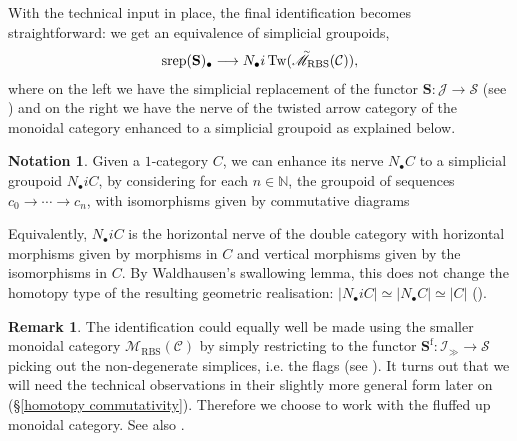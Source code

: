 \documentclass[12pt, reqno]{amsart}
\theoremstyle{plain}
\theoremstyle{definition}
\newtheorem{remark}[theorem]{Remark}
\newtheorem{notation}[theorem]{Notation}
\newcommand{\N}{\mathbb N}
\begin{document}
With the technical input in place, the final identification becomes straightforward: we get an equivalence of simplicial groupoids,
\begin{align*}
\operatorname{srep}(\mathbf{S})_\bullet \longrightarrow N_\bullet i \operatorname{Tw}(\accentset{\sim}{\mathscr{M}}_{\operatorname{RBS}}(\mathcal{C})),
\end{align*}
where on the left we have the simplicial replacement of the functor $\mathbf{S}\colon \mathcal{J}\rightarrow \mathcal{S}$ (see ) and on the right we have the nerve of the twisted arrow category of the monoidal category enhanced to a simplicial groupoid as explained below.

\begin{notation}\label{maximal subgroupoids}
Given a $1$-category $C$, we can enhance its nerve $N_\bullet C$ to a simplicial groupoid $N_\bullet iC$, by considering for each $n\in \N$, the groupoid of sequences $c_0\rightarrow \cdots \rightarrow c_n$, with isomorphisms given by commutative diagrams
\begin{center}
\end{center}
Equivalently, $N_\bullet iC$ is the horizontal nerve of the double category with horizontal morphisms given by morphisms in $C$ and vertical morphisms given by the isomorphisms in $C$. By Waldhausen's swallowing lemma, this does not change the homotopy type of the resulting geometric realisation: $|N_\bullet iC|\simeq |N_\bullet C| \simeq |C|$ (\cite[Lemma 1.6.5]{Waldhausen}).
\end{notation}

\begin{remark}
The identification could equally well be made using the smaller monoidal category $\mathscr{M}_{\operatorname{RBS}}(\mathcal{C})$ by simply restricting to the functor $\mathbf{S}^{\operatorname{f}}\colon \mathcal{I}_\gg\rightarrow \mathcal{S}$ picking out the non-degenerate simplices, i.e. the flags (see ). It turns out that we will need the technical observations in their slightly more general form later on (\S \ref{homotopy commutativity}). Therefore we choose to work with the fluffed up monoidal category. See also .
\end{remark}
\end{document}
